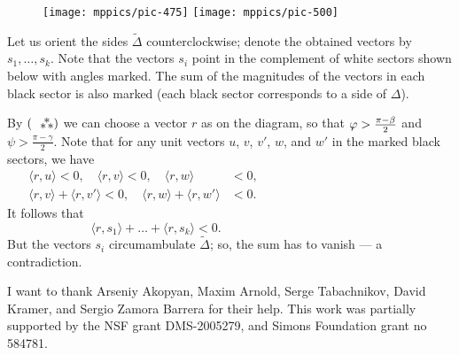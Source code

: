 \documentclass[oneside,a4paper]{amsart}
\begin{document}
\begin{figure}
\vskip-2mm
\centering
\texttt{[image: mppics/pic-475]}
\bigskip
\texttt{[image: mppics/pic-500]}
\vskip1mm
\end{figure}

Let us orient the sides $\tilde\Delta$ counterclockwise;
denote the obtained vectors by $s_1,\dots,s_k$.
Note that the vectors $s_i$ point in the complement of white sectors shown below with angles marked.
The sum of the magnitudes of the vectors in each black sector is also marked (each black sector corresponds to a side of $\Delta$).

By $(\asterism)$ we can choose a vector $r$ as on the diagram, so that $\phi\z>\tfrac{\pi-\beta}2$ and $\psi>\tfrac{\pi-\gamma}2$.
Note that for any unit vectors $u$, $v$, $v'$, $w$, and $w'$ in the marked black sectors,
we have
\[\begin{aligned}
\langle r,u\rangle<0,\quad \langle r,v\rangle<0,\quad \langle r,w\rangle&<0,
\\
\langle r,v\rangle+\langle r,v'\rangle<0,\quad \langle r,w\rangle+\langle r,w'\rangle&<0.
 \end{aligned}
\qquad\qquad\qquad\qquad\qquad\qquad\qquad\]
It follows that 
\[
\langle r,s_1\rangle+\dots+\langle r,s_k\rangle<0.\qquad\qquad\qquad\qquad\qquad\qquad
\]
But the vectors $s_i$ circumambulate $\tilde\Delta$;
so, the sum has to vanish
--- a contradiction.

{\small {}
I want to thank Arseniy Akopyan, Maxim Arnold, Serge Tabachnikov, David Kramer, and Sergio Zamora Barrera for their help.
This work was partially supported by the NSF grant DMS-2005279, and Simons Foundation grant no 584781.}



{\sloppy
\printbibliography
\fussy
}
\end{document}
